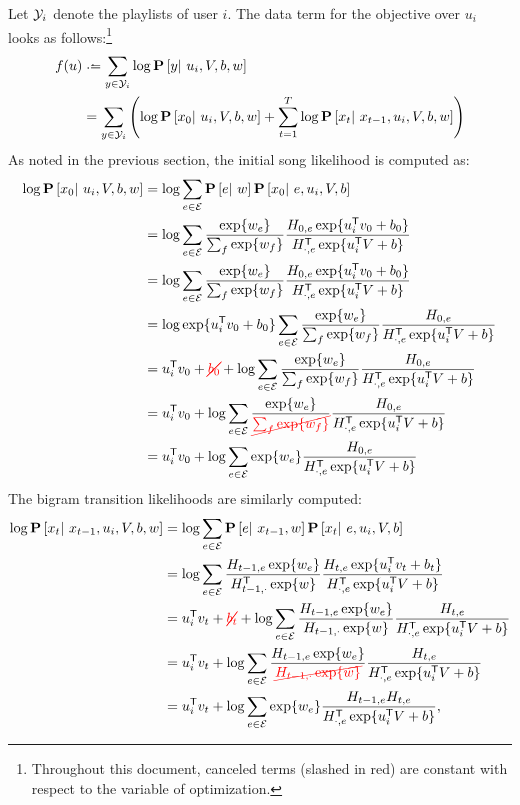 \documentclass{article}
\newcommand{\ccancel}[2][black]{\color{#1}\cancel{#2}\normalcolor}
\def\E{\ensuremath{\mathcal{E}}}
\begin{document}
Let $\mathcal{Y}_i$ denote the playlists of user $i$. The data term for the objective over $u_i$ looks as follows:\footnote{Throughout this document, canceled terms (slashed in red) are 
constant with respect to the variable of optimization.}
\begin{align}
f(u) &\defeq \sum_{y \in \Y_i} \log\P\left[y\given u_i, V, b, w\right]\notag\\
&= \sum_{y \in \Y_i}\left( \log \P\left[x_0 \given u_i, V, b, w \right] + \sum_{t=1}^T \log \P\left[x_t \given x_{t-1}, u_i, V, b, w \right] \right)\label{eq:ustep:obj}
\end{align}
As noted in the previous section, the initial song likelihood is computed as:
\begin{align}
\log\P\left[x_0 \given u_i, V, b, w\right] &= \log\sum_{e\in \E} \P\left[e\given w\right]\P\left[x_0 \given e, u_i, V, b \right] \notag\\
&= \log\sum_{e\in \E} \frac{\exp\{ w_e\}}{\sum_f \exp\{w_f\}} \frac{H_{0, e} \exp\{u_i\trans v_0 + b_0 \} }{H_{\cdot, e}\trans \exp\{u_i\trans V + b \} }\notag\\
&= \log\sum_{e\in \E} \frac{\exp\{ w_e\}}{\sum_{f} \exp\{w_f\}} \frac{H_{0, e} \exp\{u_i\trans v_0 + b_0 \} }{H_{\cdot, e}\trans \exp\{u_i\trans V + b \} }\notag\\
&= \log \exp\{u_i\trans v_0 + b_0 \} \sum_{e \in \E} \frac{\exp\{ w_e \}}{\sum_f \exp\{w_f\}}\frac{ H_{0, e} }{H_{\cdot, e}\trans \exp\{u_i\trans V + b \} }\notag\\
&= u_i\trans v_0 + \ccancel[red]{b_0} + \log \sum_{e\in \E}\frac{\exp\{w_e\}}{\sum_f \exp\{w_f\}}\frac{ H_{0, e}}{H_{\cdot, e}\trans \exp\{u_i\trans V + b \}}\notag\\
&= u_i\trans v_0 + \log \sum_{e\in \E}\frac{\exp\{w_e\}}{\ccancel[red]{\sum_f \exp\{w_f\}}}\frac{ H_{0, e}}{H_{\cdot, e}\trans \exp\{u_i\trans V + b \}}\notag\\%
&= u_i\trans v_0 + \log \sum_{e\in \E}\exp\{w_e\}\frac{ H_{0, e}}{H_{\cdot, e}\trans \exp\{u_i\trans V + b \}}\label{eq:ustep:initial}
\end{align}
The bigram transition likelihoods are similarly computed:
\begin{align}
\log\P\left[x_t \given x_{t-1}, u_i, V, b, w\right] &= \log\sum_{e\in \E} \P\left[e \given x_{t-1}, w \right]\P\left[x_t \given e, u_i, V, b \right]\notag\\
&= \log\sum_{e\in \E} \frac{H_{t-1,e} \exp\{w_e\} }{H_{t-1,\cdot}\trans \exp\{w\}} \frac{H_{t,e} \exp\{u_i\trans v_t + b_t \} }{H_{\cdot,e}\trans \exp\{u_i\trans V + b \} }\notag\\
&= u_i\trans v_t + \ccancel[red]{b_t} + \log\sum_{e\in \E} \frac{H_{t-1,e}\exp\{w_e\} }{H_{t-1,\cdot}\exp\{w\}}\frac{H_{t, e}}{H_{\cdot,e}\trans \exp\{u_i\trans V + b \} }\notag\\
&= u_i\trans v_t + \log\sum_{e\in \E} \frac{H_{t-1,e} \exp\{w_e\}}{\ccancel[red]{H_{t-1,\cdot} \exp\{w\} }}\frac{ H_{t,e} }{H_{\cdot,e}\trans \exp\{u_i\trans V + b \} }\notag\\
&= u_i\trans v_t + \log\sum_{e\in \E} \exp\{w_e\} \frac{H_{t-1,e} H_{t,e} }{H_{\cdot,e}\trans \exp\{u_i\trans V + b \} },\label{eq:ustep:bigram}
\end{align}
\end{document}
